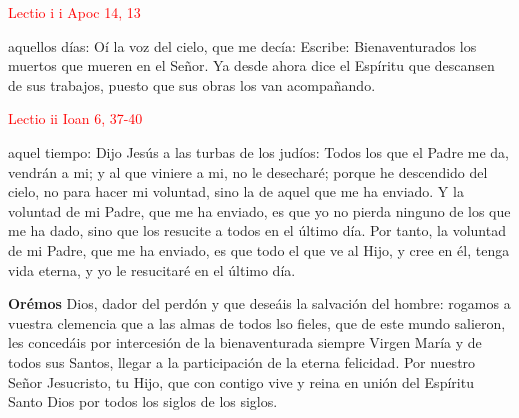 \noindent\textcolor{red}{Lectio i \hfill i Apoc 14, 13}

aquellos días: Oí la voz del cielo, que me decía: Escribe: Bienaventurados los muertos que mueren en el Señor. Ya desde ahora dice el Espíritu que descansen
de sus trabajos, puesto que sus obras los van acompañando.

\vspace{0.5em}

\noindent\textcolor{red}{Lectio ii \hfill Ioan 6, 37-40}

aquel tiempo: Dijo Jesús a las turbas de los judíos: Todos los que el Padre me da, vendrán a mi; y al que viniere a mi, no le desecharé; porque he descendido
del cielo, no para hacer mi voluntad, sino la de aquel que me ha enviado. Y la voluntad de mi Padre, que me ha enviado, es que yo no pierda ninguno de los que
me ha dado, sino que los resucite a todos en el último día. Por tanto, la voluntad de mi Padre, que me ha enviado, es que todo el que ve al Hijo, y cree en él,
tenga vida eterna, y yo le resucitaré en el último día.

\vspace{0.5em}

\textbf{Orémos}
Dios, dador del perdón y que deseáis la salvación del hombre: rogamos a vuestra clemencia que a las almas de todos lso fieles, que de este mundo salieron,
les concedáis por intercesión de la bienaventurada siempre Virgen María y de todos sus Santos, llegar a la participación de la eterna felicidad. Por nuestro
Señor Jesucristo, tu Hijo, que con contigo vive y reina en unión del Espíritu Santo Dios por todos los siglos de los siglos. 

\vspace{0.5mm}

\begin{otherlanguage}{latin}
      

      \vspace{0.25em}

      
      
      \vspace{0.25em}

      

      \vspace{0.25em}

      
\end{otherlanguage}